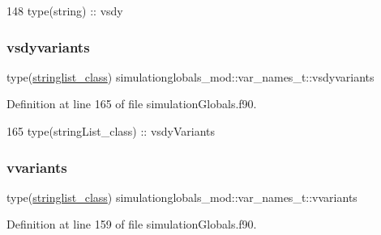 \begin{DoxyCode}
148         \textcolor{keywordtype}{type}(string) :: vsdy
\end{DoxyCode}
\mbox{\label{structsimulationglobals__mod_1_1var__names__t_aa439cf2b4269b66875ebae8f13d22a0c}} 
\subsubsection{\texorpdfstring{vsdyvariants}{vsdyvariants}}
{\footnotesize\ttfamily type(\mbox{\hyperlink{structsimulationglobals__mod_1_1stringlist__class}{stringlist\+\_\+class}}) simulationglobals\+\_\+mod\+::var\+\_\+names\+\_\+t\+::vsdyvariants\hspace{0.3cm}{\ttfamily [private]}}



Definition at line 165 of file simulation\+Globals.\+f90.


\begin{DoxyCode}
165         \textcolor{keywordtype}{type}(stringList\_class) :: vsdyVariants
\end{DoxyCode}
\mbox{\label{structsimulationglobals__mod_1_1var__names__t_af5fb2ba506cc220275c330dca9674b0e}} 
\subsubsection{\texorpdfstring{vvariants}{vvariants}}
{\footnotesize\ttfamily type(\mbox{\hyperlink{structsimulationglobals__mod_1_1stringlist__class}{stringlist\+\_\+class}}) simulationglobals\+\_\+mod\+::var\+\_\+names\+\_\+t\+::vvariants\hspace{0.3cm}{\ttfamily [private]}}



Definition at line 159 of file simulation\+Globals.\+f90.


